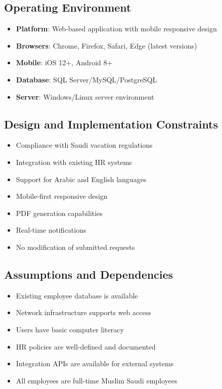 \documentclass[12pt,a4paper]{article}
\begin{document}
\subsection{Operating Environment}
\begin{itemize}
    \item \textbf{Platform}: Web-based application with mobile responsive design
    \item \textbf{Browsers}: Chrome, Firefox, Safari, Edge (latest versions)
    \item \textbf{Mobile}: iOS 12+, Android 8+
    \item \textbf{Database}: SQL Server/MySQL/PostgreSQL
    \item \textbf{Server}: Windows/Linux server environment
\end{itemize}

\subsection{Design and Implementation Constraints}
\begin{itemize}
    \item Compliance with Saudi vacation regulations
    \item Integration with existing HR systems
    \item Support for Arabic and English languages
    \item Mobile-first responsive design
    \item PDF generation capabilities
    \item Real-time notifications
    \item No modification of submitted requests
\end{itemize}

\subsection{Assumptions and Dependencies}
\begin{itemize}
    \item Existing employee database is available
    \item Network infrastructure supports web access
    \item Users have basic computer literacy
    \item HR policies are well-defined and documented
    \item Integration APIs are available for external systems
    \item All employees are full-time Muslim Saudi employees
\end{itemize}
\end{document}
